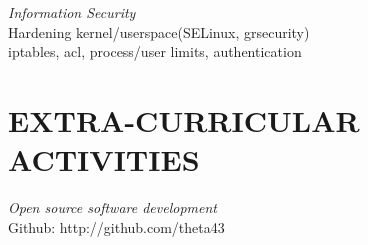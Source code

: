 \documentclass[11pt,line,margin]{res}
\begin{document}
\begin{resume}
		{\sl Information Security} \\
		Hardening kernel/userspace(SELinux, grsecurity) \\
		iptables, acl, process/user limits, authentication


\section{EXTRA-CURRICULAR \\ ACTIVITIES}             
		{\sl Open source software development} \\
		Github: http://github.com/theta43 \\

\end{resume}
\end{document}

